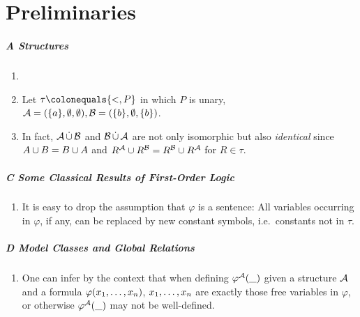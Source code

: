 \chapter{Preliminaries}
\paragraph{A Structures}
\begin{enumerate}[1.]
%
\item {}
%
\item {} Let $\tau \defas \sete{{<}, P}$ in which $P$ is unary, $\mathcal{A} = ({\{a\}}, \emptyset, \emptyset), \mathcal{B} = ({\{b\}}, \emptyset, {\{b\}})$.
%
\item {} In fact, $\mathcal{A} \mathop{\dot{\cup}} \mathcal{B}$ and $\mathcal{B} \mathop{\dot{\cup}} \mathcal{A}$ are not only isomorphic but also \emph{identical} since $A \cup B = B \cup A$ and $R^{\mathcal{A}} \cup R^{\mathcal{B}} = R^{\mathcal{B}} \cup R^{\mathcal{A}}$ for $R \in \tau$.
%
\end{enumerate}
\paragraph{C Some Classical Results of First-Order Logic}
\begin{enumerate}[1.]
%
\item {} It is easy to drop the assumption that $\varphi$ is a sentence: All variables occurring in $\varphi$, if any, can be replaced by new constant symbols, i.e.\ constants not in $\tau$.
%
\end{enumerate}
\paragraph{D Model Classes and Global Relations}
\begin{enumerate}[1.]
%
\item {} One can infer by the context that when defining ${\varphi^{\mathcal{A}}(\_)}$ given a structure $\mathcal{A}$ and a formula $\varphi(x_{1}, \ldots, x_{n})$, $x_{1}, \ldots, x_{n}$ are exactly those free variables in $\varphi$, or otherwise ${\varphi^{\mathcal{A}}(\_)}$ may not be well-defined.
%
\end{enumerate}
